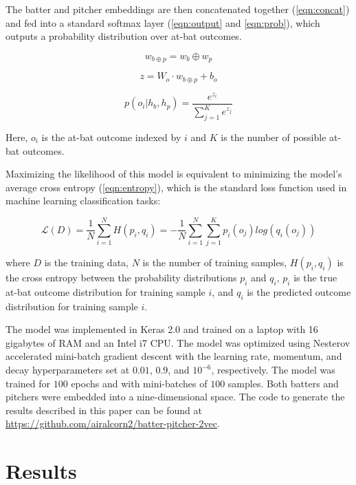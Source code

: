 \documentclass{article}
\begin{document}
The batter and pitcher embeddings are then concatenated together (\ref{eqn:concat}) and fed into a standard softmax layer (\ref{eqn:output} and \ref{eqn:prob}), which outputs a probability distribution over at-bat outcomes.

\begin{equation}
\label{eqn:concat}
w_{b \oplus p} = w_b \oplus w_p
\end{equation}

\begin{equation}
\label{eqn:output}
z = W_o \cdot w_{b \oplus p} + b_o
\end{equation}

\begin{equation}
\label{eqn:prob}
p(o_i | h_b, h_p) = \frac{e^{z_i}}{\sum_{j=1}^{K} e^{z_j}}
\end{equation}

Here, $o_i$ is the at-bat outcome indexed by $i$ and $K$ is the number of possible at-bat outcomes.

Maximizing the likelihood of this model is equivalent to minimizing the model's average cross entropy (\ref{eqn:entropy}), which is the standard loss function used in machine learning classification tasks:

\begin{equation}
\label{eqn:entropy}
\mathcal{L}(D) = \frac{1}{N}\sum_{i=1}^{N}H(p_i,q_i) = -\frac{1}{N}\sum_{i=1}^{N}\sum_{j=1}^{K} p_i(o_j)log(q_i(o_j))
\end{equation}

where $D$ is the training data, $N$ is the number of training samples, $H(p_i,q_i)$ is the cross entropy between the probability distributions $p_i$ and $q_i$, $p_i$ is the true at-bat outcome distribution for training sample $i$, and $q_i$ is the predicted outcome distribution for training sample $i$.

The model was implemented in Keras 2.0 \parencite{Keras2015} and trained on a laptop with 16 gigabytes of RAM and an Intel i7 CPU. The model was optimized using Nesterov accelerated mini-batch gradient descent with the learning rate, momentum, and decay hyperparameters set at $0.01$, $0.9$, and $10^{-6}$, respectively. The model was trained for $100$ epochs and with mini-batches of $100$ samples. Both batters and pitchers were embedded into a nine-dimensional space. The code to generate the results described in this paper can be found at \url{https://github.com/airalcorn2/batter-pitcher-2vec}.

\section{Results}
\label{results}
\end{document}
